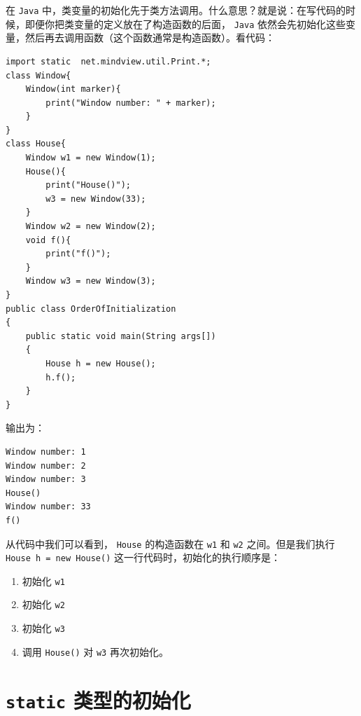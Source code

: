 \documentclass[10pt,a4paper,UTF8]{article}
\begin{document}
在 \texttt{Java} 中，类变量的初始化先于类方法调用。什么意思？就是说：在写代码的时候，即便你把类变量的定义放在了构造函数的后面， \texttt{Java} 依然会先初始化这些变量，然后再去调用函数（这个函数通常是构造函数）。看代码：
\lstset{language=C,label= ,caption= ,captionpos=b,firstnumber=1,numbers=left}
\begin{lstlisting}
import static  net.mindview.util.Print.*;
class Window{
    Window(int marker){
        print("Window number: " + marker);
    }
}
class House{
    Window w1 = new Window(1);
    House(){
        print("House()");
        w3 = new Window(33);
    }
    Window w2 = new Window(2);
    void f(){
        print("f()");
    }
    Window w3 = new Window(3);
}
public class OrderOfInitialization
{
    public static void main(String args[])
    {
        House h = new House();
        h.f();
    }
}
\end{lstlisting}
输出为：
\begin{verbatim}
Window number: 1
Window number: 2
Window number: 3
House()
Window number: 33
f()
\end{verbatim}

从代码中我们可以看到， \texttt{House} 的构造函数在 \texttt{w1} 和 \texttt{w2} 之间。但是我们执行 \texttt{House h = new House()} 这一行代码时，初始化的执行顺序是： 
\begin{enumerate}
\item 初始化  \texttt{w1}
\item 初始化 \texttt{w2}
\item 初始化 \texttt{w3}
\item 调用 \texttt{House()} 对 \texttt{w3} 再次初始化。
\end{enumerate}

\section{\texttt{static} 类型的初始化}
\label{sec:orgb9b48a8}
\end{document}
